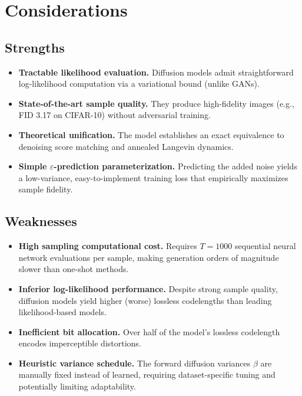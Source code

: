 \documentclass[10pt]{article}
\begin{document}
\section*{Considerations}
\subsection*{Strengths}
\begin{itemize}
    \item \textbf{Tractable likelihood evaluation.} Diffusion models admit straightforward log-likelihood computation via a variational bound (unlike GANs).
    \item \textbf{State-of-the-art sample quality.} They produce high-fidelity images (e.g., FID 3.17 on CIFAR-10) without adversarial training.
    \item \textbf{Theoretical unification.} The model establishes an exact equivalence to denoising score matching and annealed Langevin dynamics.
    \item \textbf{Simple \(\varepsilon\)-prediction parameterization.} Predicting the added noise yields a low-variance, easy-to-implement training loss that empirically maximizes sample fidelity.
\end{itemize}

\subsection*{Weaknesses}
\begin{itemize}
    \item \textbf{High sampling computational cost.} Requires \(T=1000\) sequential neural network evaluations per sample, making generation orders of magnitude slower than one-shot methods.
    \item \textbf{Inferior log-likelihood performance.} Despite strong sample quality, diffusion models yield higher (worse) lossless codelengths than leading likelihood-based models.
    \item \textbf{Inefficient bit allocation.} Over half of the model's lossless codelength encodes imperceptible distortions.
    \item \textbf{Heuristic variance schedule.} The forward diffusion variances \(\beta\) are manually fixed instead of learned, requiring dataset-specific tuning and potentially limiting adaptability.
\end{itemize}
\end{document}
